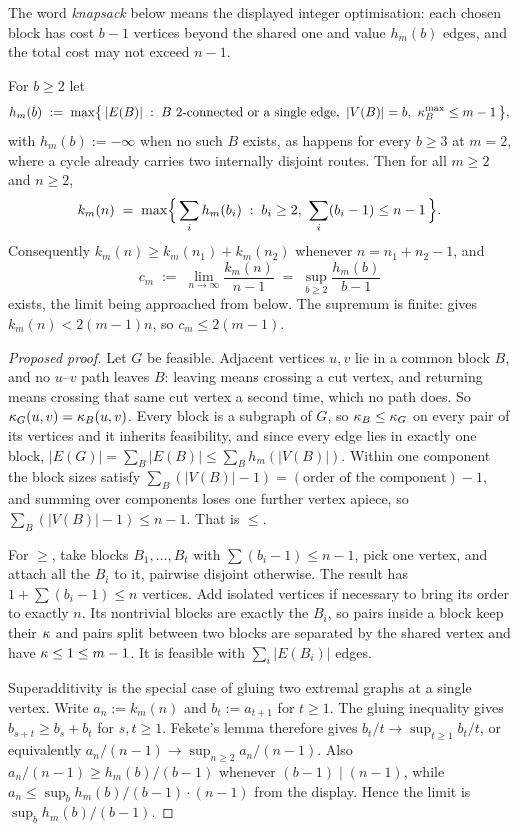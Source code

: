 The word \emph{knapsack} below means the displayed integer optimisation: each
chosen block has cost $b-1$ vertices beyond the shared one and value $h_m(b)$
edges, and the total cost may not exceed $n-1$.

\begin{conjecture}\label{thm:simple-vertex-blocks}
For $b \ge 2$ let
\[
    h_m(b) \;:=\; \max\bigl\{\, |E(B)| \;:\; B \text{ $2$-connected or a single edge},\ |V(B)| = b,\ \kap^{\max}_B \le m-1 \,\bigr\} ,
\]
with $h_m(b) := -\infty$ when no such $B$ exists, as happens for every $b \ge 3$ at $m = 2$, where a cycle already carries two internally disjoint routes.
Then for all $m \ge 2$ and $n \ge 2$,
\[
    k_m(n) \;=\; \max\Bigl\{\, \sum_i h_m(b_i) \;:\; b_i \ge 2,\ \sum_i (b_i - 1) \le n-1 \,\Bigr\} .
\]
Consequently $k_m(n) \ge k_m(n_1) + k_m(n_2)$ whenever $n = n_1 + n_2 - 1$, and
\[
    c_m \;:=\; \lim_{n \to \infty} \frac{k_m(n)}{n-1} \;=\; \sup_{b \ge 2} \frac{h_m(b)}{b-1}
\]
exists, the limit being approached from below. The supremum is finite:  gives $k_m(n) < 2(m-1)n$, so $c_m \le 2(m-1)$.
\end{conjecture}

\begin{proof}[Proposed proof]
Let $G$ be feasible. Adjacent vertices $u,v$ lie in a common block $B$, and no $u$--$v$ path leaves $B$: leaving means crossing a cut vertex, and returning means crossing that same cut vertex a second time, which no path does. So $\kappa_G(u,v) = \kappa_B(u,v)$. Every block is a subgraph of $G$, so $\kappa_B \le \kappa_G$ on every pair of its vertices and it inherits feasibility, and since every edge lies in exactly one block, $|E(G)| = \sum_B |E(B)| \le \sum_B h_m(|V(B)|)$. Within one component the block sizes satisfy $\sum_B (|V(B)|-1) = (\text{order of the component}) - 1$, and summing over components loses one further vertex apiece, so $\sum_B (|V(B)|-1) \le n-1$. That is $\le$.

For $\ge$, take blocks $B_1, \dots, B_t$ with $\sum (b_i - 1) \le n-1$, pick one vertex, and attach all the $B_i$ to it, pairwise disjoint otherwise. The result has $1 + \sum(b_i-1) \le n$ vertices. Add isolated vertices if necessary to bring its order to exactly $n$. Its nontrivial blocks are exactly the $B_i$, so pairs inside a block keep their $\kappa$ and pairs split between two blocks are separated by the shared vertex and have $\kappa \le 1 \le m-1$. It is feasible with $\sum_i |E(B_i)|$ edges.

Superadditivity is the special case of gluing two extremal graphs at a single
vertex. Write $a_n := k_m(n)$ and $b_t := a_{t+1}$ for $t\ge1$.
The gluing inequality gives $b_{s+t}\ge b_s+b_t$ for $s,t\ge1$.
Fekete's lemma \cite{Fekete23} therefore gives
$b_t/t\to\sup_{t\ge1}b_t/t$, or equivalently
$a_n/(n-1)\to\sup_{n\ge2}a_n/(n-1)$. Also
$a_n/(n-1) \ge h_m(b)/(b-1)$ whenever $(b-1) \mid (n-1)$, while
$a_n \le \sup_b h_m(b)/(b-1) \cdot (n-1)$ from the display. Hence the limit is
$\sup_b h_m(b)/(b-1)$.
\end{proof}


